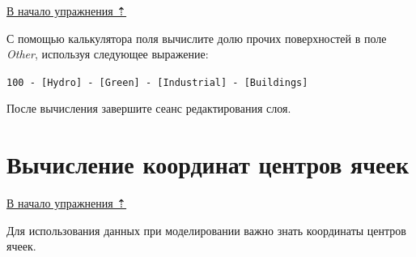 \documentclass[]{book}
\theoremstyle{definition}
\theoremstyle{definition}
\theoremstyle{definition}
\theoremstyle{remark}
\begin{document}
\protect\hyperlink{land-cover-hydro}{В начало упражнения ⇡}

С помощью калькулятора поля вычислите долю прочих поверхностей в поле
\emph{Other}, используя следующее выражение:

\texttt{100\ -\ {[}Hydro{]}\ -\ {[}Green{]}\ -\ {[}Industrial{]}\ -\ {[}Buildings{]}}

После вычисления завершите сеанс редактирования слоя.

\hypertarget{land-cover-hydro-other-centers}{%
\section{Вычисление координат центров
ячеек}\label{land-cover-hydro-other-centers}}

\protect\hyperlink{land-cover-hydro}{В начало упражнения ⇡}

Для использования данных при моделировании важно знать координаты
центров ячеек.
\end{document}
